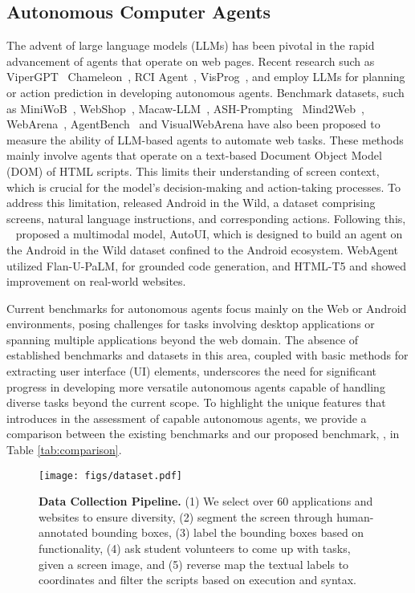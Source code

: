 \subsection{Autonomous Computer Agents}
The advent of large language models (LLMs) has been pivotal in the rapid advancement of agents that operate on web pages. Recent research such as ViperGPT~\cite{surís2023vipergpt} Chameleon~\cite{lu2023chameleon}, RCI Agent~\cite{kim2023language}, VisProg~\cite{gupta2023visual}, and \cite{nakano2021webgpt} employ LLMs for planning or action prediction in developing autonomous agents. Benchmark datasets, such as MiniWoB~\cite{shi2017world}, WebShop~\cite{yao2022webshop}, 
Macaw-LLM~\cite{lyu2023macaw},
ASH-Prompting~\cite{sridhar2023hierarchical}
Mind2Web~\cite{deng2023mind2web}, WebArena~\cite{zhou2023webarena}, AgentBench~\cite{liu2023agentbench}  and VisualWebArena \cite{koh2024visualwebarena} 
have also been proposed to measure the ability of LLM-based agents to automate web tasks. These methods mainly involve agents that operate on a text-based Document Object Model (DOM) of HTML scripts. This limits their understanding of screen context, which is crucial for the model's decision-making and action-taking processes. To address this limitation, \cite{rawles2023android} released Android in the Wild, a dataset comprising screens, natural language instructions, and corresponding actions. Following this, ~\cite{autoui} proposed a multimodal model, AutoUI, which is designed to build an agent on the Android in the Wild dataset confined to the Android ecosystem. WebAgent \cite{gur2024realworld-WebAgent} utilized Flan-U-PaLM, for grounded code generation, and HTML-T5 and showed improvement on real-world websites.

Current benchmarks for autonomous agents focus mainly on the Web or Android environments, posing challenges for tasks involving desktop applications or spanning multiple applications beyond the web domain. The absence of established benchmarks and datasets in this area, coupled with basic methods for extracting user interface (UI) elements, underscores the need for significant progress in developing more versatile autonomous agents capable of handling diverse tasks beyond the current scope. To highlight the unique features that \ModelName{} introduces in the assessment of capable autonomous agents, we provide a comparison between the existing benchmarks and our proposed benchmark, \ModelName{}, in Table \ref{tab:comparison}.

\begin{figure*}[!ht]
    \centering
    \texttt{[image: figs/dataset.pdf]}
    \caption{\textbf{Data Collection Pipeline.} (1) We select over 60 applications and websites to ensure diversity, (2) segment the screen through human-annotated bounding boxes, (3) label the bounding boxes based on functionality, (4) ask student volunteers to come up with tasks, given a screen image, and (5) reverse map the textual labels to coordinates and filter the scripts based on execution and syntax.}
    \label{fig:dataset}
\end{figure*}
